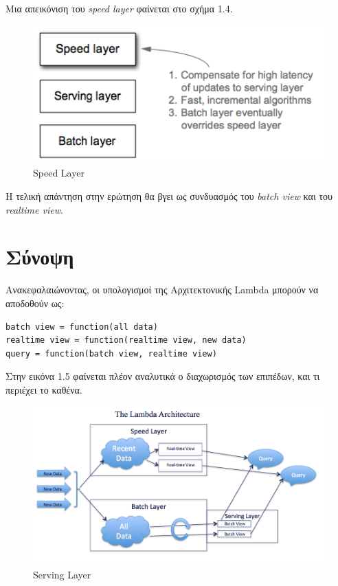 Μια απεικόνιση του \textit{speed layer} φαίνεται στο σχήμα 1.4.
\begin{figure}[t]
\caption{Speed Layer}
\includegraphics[width=12cm]{images/speed_layer.png}
\centering
\end{figure}
\clearpage

Η τελική απάντηση στην ερώτηση θα βγει ως συνδυασμός του \textit{batch view} και του \textit{realtime view}.

\section{Σύνοψη}
Ανακεφαλαιώνοντας, οι υπολογισμοί της Αρχιτεκτονικής Lambda μπορούν να αποδοθούν ως:
\begin{verbatim}
batch view = function(all data)
realtime view = function(realtime view, new data)
query = function(batch view, realtime view)
\end{verbatim}

Στην εικόνα 1.5 φαίνεται πλέον αναλυτικά ο διαχωρισμός των επιπέδων, και τι περιέχει το καθένα.
\begin{figure}[t]
\caption{Serving Layer}
\includegraphics[width=15cm]{images/lambda.png}
\centering
\end{figure}
\clearpage